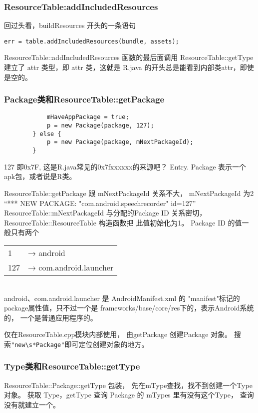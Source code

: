 \documentclass[a4paper,11pt]{article}
\begin{document}
\subsubsection{ResourceTable:addIncludedResources}
回过头看，buildResources 开头的一条语句 
\begin{lstlisting}
err = table.addIncludedResources(bundle, assets);
\end{lstlisting}
 ResourceTable::addIncludedResources 函数的最后面调用 ResourceTable::getType
 建立了 attr 类型，即 attr 类，这就是 R.java 的开头总是能看到内部类attr，即使是空的。

\subsubsection{Package类和ResourceTable::getPackage}\label{getpackage}
\begin{lstlisting}
            mHaveAppPackage = true;
            p = new Package(package, 127);
        } else {
            p = new Package(package, mNextPackageId);
        }
\end{lstlisting}
127 即0x7F, 这是R.java常见的0x7fxxxxxx的来源吧？ Entry.
Package 表示一个apk包，或者说是R类。


ResourceTable::getPackage 跟 mNextPackageId 关系不大， mNextPackageId 为2
“*** NEW PACKAGE: "com.android.speechrecorder" id=127”
ResourceTable::mNextPackageId 与分配的Package ID 关系密切，
ResourceTable::ResourceTable 构造函数把 此值初始化为1。  
Package ID 的值一般只有两个 \\
\begin{tabular}{ll}
1  & →  android \\
127 & → com.android.launcher\\
\end{tabular}\\
android、com.android.launcher 是 AndroidManifest.xml 的 "manifest"标记的
package属性值，只不过一个是 frameworks/base/core/res下的，表示Android系统的，
一个是普通应用程序的。

仅在ResourceTable.cpp模块内部使用， 由getPackage 创建Package 对象。
搜索\verb|"new\s*Package"|即可定位创建对象的地方。

\subsubsection{Type类和ResourceTable::getType}\label{restblgtype}
ResourceTable::Package::getType 包装， 先在mType查找，找不到创建一个Type对象。
获取 Type，getType 查询 Package 的 mTypes 里有没有这个Type， 查询没有就建立一个。
\end{document}
